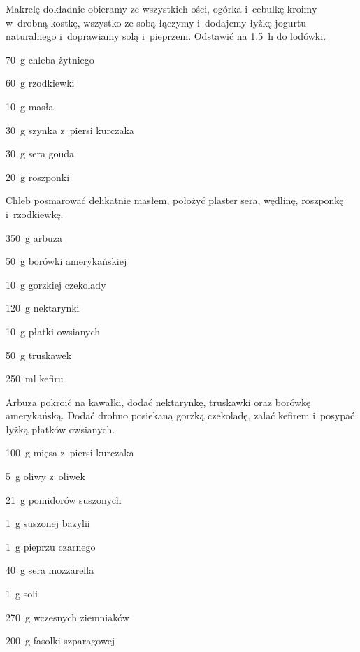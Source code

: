\documentclass[../kucharek.tex]{subfiles}
\begin{document}
Makrelę dokładnie obieramy ze wszystkich ości, ogórka i~cebulkę kroimy w~drobną
kostkę, wszystko ze sobą łączymy i~dodajemy łyżkę jogurtu naturalnego
i~doprawiamy solą i~pieprzem. Odstawić na \qty{1.5}{\hour} do lodówki.


\begin{Ingred}
    \item \qty{70}{\gram} chleba żytniego
    \item \qty{60}{\gram} rzodkiewki
    \item \qty{10}{\gram} masła
    \item \qty{30}{\gram} szynka z~piersi kurczaka
    \item \qty{30}{\gram} sera gouda
    \item \qty{20}{\gram} roszponki
\end{Ingred}

Chleb posmarować delikatnie masłem, położyć plaster sera, wędlinę, roszponkę
i~rzodkiewkę.


\begin{Ingred}
    \item \qty{350}{\gram} arbuza
    \item \qty{50}{\gram} borówki amerykańskiej
    \item \qty{10}{\gram} gorzkiej czekolady
    \item \qty{120}{\gram} nektarynki
    \item \qty{10}{\gram} płatki owsianych
    \item \qty{50}{\gram} truskawek
    \item \qty{250}{\milli\litre} kefiru
\end{Ingred}

Arbuza pokroić na kawałki, dodać nektarynkę, truskawki oraz borówkę
amerykańską. Dodać drobno posiekaną gorzką czekoladę, zalać kefirem i~posypać
łyżką płatków owsianych.


\begin{Ingred}
    \item \qty{100}{\gram} mięsa z~piersi kurczaka
    \item \qty{5}{\gram} oliwy z~oliwek
    \item \qty{21}{\gram} pomidorów suszonych
    \item \qty{1}{\gram} suszonej bazylii
    \item \qty{1}{\gram} pieprzu czarnego
    \item \qty{40}{\gram} sera mozzarella
    \item \qty{1}{\gram} soli
    \item \qty{270}{\gram} wczesnych ziemniaków
    \item \qty{200}{\gram} fasolki szparagowej
\end{Ingred}
\end{document}
